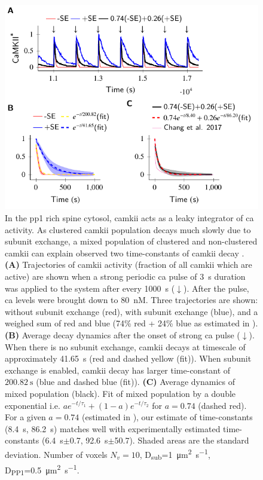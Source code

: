 \documentclass[9pt,lineno,doublespacing]{elife}
\newcommand\SUB[2]{#1\textsubscript{#2}}
\begin{document}
\begin{figure}%
    \includegraphics[width=11.4cm]{PaperFigures/elifeFigure6/figure_two_timecourses_114mm.pdf}
    \caption{ In the \gls{pp1} rich spine cytosol, \gls{camkii} acts as a leaky integrator of \gls{ca} 
        activity. As clustered \gls{camkii} population decays much slowly due
        to subunit exchange, a mixed population of clustered and non-clustered \gls{camkii}
        can explain observed two time-constants of \gls{camkii} decay \citep{chang_camkii_2017}.
        \textbf{(A)} Trajectories of \gls{camkii} activity (fraction of all
        \gls{camkii} which are active) are shown when a strong periodic \gls{ca} pulse of \SI{3}{\second}
        duration was applied to the system after every \SI{1000}{\second} ($\downarrow$).
        After the pulse, \gls{ca} levels were brought down to \SI{80}{\nano M}. 
        Three trajectories are shown: without subunit exchange (red), with
        subunit exchange (blue), and a weighed sum of red and blue (74\%
        red + 24\% blue as estimated in \citep{chang_camkii_2017}). 
        \textbf{(B)} Average decay dynamics after the onset of strong \gls{ca} pulse ($\downarrow$). 
        When there is no subunit exchange, \gls{camkii} decays at timescale of
        approximately \SI{41.65}{\second} (red and dashed yellow (fit)). When subunit exchange is enabled, 
        \gls{camkii} decay has larger time-constant of $\SI{200.82}{\second}$
        (blue and dashed blue (fit)). \textbf{(C)} Average dynamics of mixed population
        (black). Fit of mixed population by a double
        exponential i.e. $ae^{-t/\tau_{1}}+(1-a)e^{-t/\tau_{2}}$ for
        $a=0.74$ (dashed red). 
        For a given $a=0.74$ (estimated in \citep{chang_camkii_2017}), our
        estimate of time-constants (\SI{8.4}{\second}, \SI{86.2}{\second}) matches well with experimentally
        estimated time-constants (\SI{6.4}{\second}$\pm$0.7, \SI{92.6}{\second}$\pm$50.7). 
        Shaded areas are the standard deviation. Number of voxels $N_{v}=10$,
        \SUB{D}{sub}=\SI{1}{\micro\meter\squared\per\second},
        \SUB{D}{PP1}=\SI{0.5}{\micro\meter\squared\per\second}.
    }\label{fig:cytosol_integrator}
\end{figure}
\end{document}
